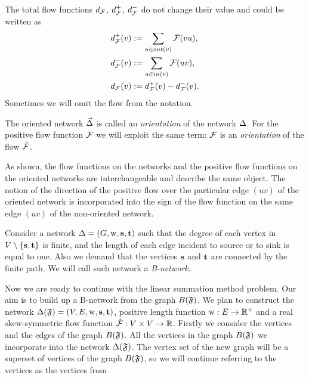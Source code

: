 \documentclass[12pt]{article}
\begin{document}
    The total flow functions $d_{\mathcal{F}}$, $d^{+}_{\mathcal{F}}$, $d^{-}_{\mathcal{F}}$ do not change their value and could be written as
    \begin{align*}
      &d^{+}_{\mathcal{F}}(v) := \sum_{u \in out(v)} \mathcal{F}(vu),\\
      &d^{-}_{\mathcal{F}}(v) := \sum_{u \in in(v)} \mathcal{F}(uv),\\
      &d_{\mathcal{F}}(v) := d^{+}_{\mathcal{F}}(v) - d^{-}_{\mathcal{F}}(v).
    \end{align*}
    Sometimes we will omit the flow from the notation.
    \begin{definition}
      The oriented network $\vec{\Delta}$ is called an \emph{orientation} of the network $\Delta$.
      For the positive flow function $\mathcal{F}$ we will exploit the same term:
        $\mathcal{F}$ is an \emph{orientation} of the flow $\mathcal{\hat{F}}$.
    \end{definition}
    \begin{remark}
      As shown, the flow functions on the networks and the positive flow functions on the oriented networks
        are interchangeable and describe the same object.
      The notion of the direction of the positive flow over the particular edge $(uv)$ of the oriented network
        is incorporated into the sign of the flow function on the same edge $(uv)$ of the non-oriented network.
    \end{remark}
    \begin{definition}
      Consider a network $\Delta = (G, \mathrm{w}, \mathbf{s}, \mathbf{t})$ such that
        the degree of each vertex in $V \setminus \{\mathbf{s}, \mathbf{t}\} $ is finite,
        and the length of each edge incident to source or to sink is equal to one.
      Also we demand that the vertices $\mathbf{s}$ and $\mathbf{t}$ are connected by the finite path.
      We will call such network a \emph{B-network}.
    \end{definition}
    Now we are ready to continue with the linear summation method problem.
    Our aim is to build up a B-network from the graph $B(\mathfrak{F})$.
    We plan to construct the network $\Delta(\mathfrak{F}) = (V, E, \mathrm{w}, \mathbf{s}, \mathbf{t})$,
    positive length function $\mathrm{w}: E \to \mathbb{R}^{+}$ and a real skew-symmetric flow function $\mathcal{\hat{F}}: V \times V \to \mathbb{R}$.
    Firstly we consider the vertices and the edges of the graph $B(\mathfrak{F})$.
    All the vertices in the graph $B(\mathfrak{F})$ we incorporate into the network $\Delta(\mathfrak{F})$.
    The vertex set of the new graph will be a superset of vertices of the graph $B(\mathfrak{F})$,
    so we will continue referring to the vertices as the vertices from
\end{document}
